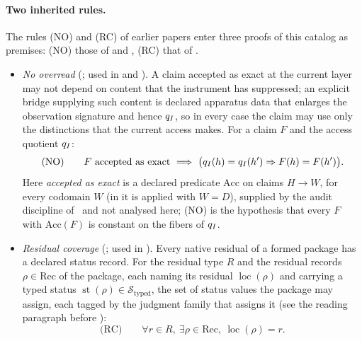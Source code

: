 \paragraph{Two inherited rules.} The rules (NO) and (RC) of earlier papers
enter three proofs of this catalog as premises: (NO) those of  and
, (RC) that of .
\begin{itemize}[topsep=2pt,itemsep=1pt]
  \item \emph{No overread} (\FoundIII; used in  and ). A claim
    accepted as exact at the current layer may not depend on content
    that the instrument has suppressed; an explicit bridge supplying such content is declared apparatus data that enlarges the observation signature and hence \(q_I\), so in every case the claim may use only the distinctions that the current
    access makes. For a claim \(F\) and the access quotient \(q_I\):
    \[
      \text{(NO)}\qquad
      F \text{ accepted as exact}
      \ \Longrightarrow\
      \bigl(q_I(h)=q_I(h')\Rightarrow F(h)=F(h')\bigr).
    \]
    Here \emph{accepted as exact} is a declared predicate \(\mathrm{Acc}\) on
    claims \(H\to W\), for every codomain \(W\) (in \Fref{F12} it is applied with \(W=D\)), supplied by the audit discipline of \FoundIII\ and not
    analysed here; (NO) is the hypothesis that every \(F\) with
    \(\mathrm{Acc}(F)\) is constant on the fibers of \(q_I\).
  \item \emph{Residual coverage} (\FoundII; used in \Fref{F9}). Every
    native residual of a formed package has a declared status record.
    For the residual type \(R\) and the residual records
    \(\rho\in\mathrm{Rec}\) of the package, each naming its residual
    \(\operatorname{loc}(\rho)\) and carrying a typed status
    \(\operatorname{st}(\rho)\in\mathcal S_{\mathrm{typed}}\), the set of status values the package may assign, each tagged by the judgment family that assigns it (see the reading paragraph before ):
    \[
      \text{(RC)}\qquad
      \forall r\in R,\ \exists \rho\in\mathrm{Rec},\
      \operatorname{loc}(\rho)=r.
    \]
\end{itemize}

